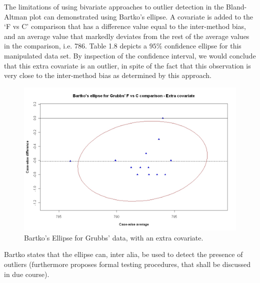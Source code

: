 \documentclass[12pt, a4paper]{report}
\theoremstyle{plain}
\theoremstyle{definition}
\theoremstyle{remark}
\begin{document}
The limitations of using bivariate approaches to outlier detection
in the Bland-Altman plot can demonstrated using Bartko's ellipse.
A covariate is added to the `F vs C' comparison that has a
difference value equal to the inter-method bias, and an average
value that markedly deviates from the rest of the average values
in the comparison, i.e. 786. Table 1.8 depicts a $95\%$ confidence
ellipse for this manipulated data set. By inspection of the
confidence interval, we would conclude that this extra
covariate is an outlier, in spite of the fact that this
observation is very close to the inter-method bias as determined by this approach.

\begin{figure}[h!]
	\includegraphics[width=130mm]{images/GrubbsBartko2.jpeg}
	\caption{Bartko's Ellipse for Grubbs' data, with an extra covariate.}\label{GrubbsBartko2}
\end{figure}




Bartko states that the ellipse can, inter alia, be used to detect the presence of outliers (furthermore
\citet{Bartko} proposes formal testing procedures, that shall be discussed in due course). 











\end{document}

